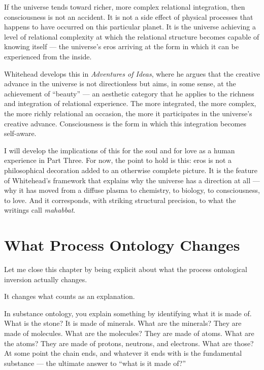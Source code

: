 If the universe tends toward richer, more complex relational integration,
then consciousness is not an accident.
It is not a side effect of physical processes that happens to have occurred
on this particular planet.
It is the universe achieving a level of relational complexity at which the
relational structure becomes capable of knowing itself --- the universe's
eros arriving at the form in which it can be experienced from the inside.

Whitehead develops this in \textit{Adventures of Ideas}, where he argues
that the creative advance in the universe is not directionless but aims,
in some sense, at the achievement of ``beauty'' --- an aesthetic category
that he applies to the richness and integration of relational experience.
The more integrated, the more complex, the more richly relational an occasion,
the more it participates in the universe's creative advance.
Consciousness is the form in which this integration becomes self-aware.

I will develop the implications of this for the soul and for love as
a human experience in Part Three.
For now, the point to hold is this: eros is not a philosophical decoration
added to an otherwise complete picture.
It is the feature of Whitehead's framework that explains why the universe
has a direction at all --- why it has moved from a diffuse plasma to
chemistry, to biology, to consciousness, to love.
And it corresponds, with striking structural precision, to what the \bahai
writings call \textit{mahabbat}.

\section{What Process Ontology Changes}
\label{sec:ch4-what-changes}

Let me close this chapter by being explicit about what the process
ontological inversion actually changes.

It changes what counts as an explanation.

In substance ontology, you explain something by identifying what it is made of.
What is the stone?
It is made of minerals.
What are the minerals?
They are made of molecules.
What are the molecules?
They are made of atoms.
What are the atoms?
They are made of protons, neutrons, and electrons.
What are those?
At some point the chain ends, and whatever it ends with is the fundamental
substance --- the ultimate answer to ``what is it made of?''

